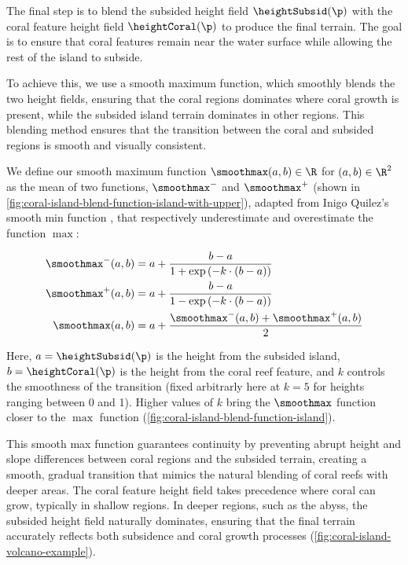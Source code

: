 The final step is to blend the subsided height field $\heightSubsid(\p)$ with the coral feature height field $\heightCoral(\p)$ to produce the final terrain. The goal is to ensure that coral features remain near the water surface while allowing the rest of the island to subside.

To achieve this, we use a smooth maximum function, which smoothly blends the two height fields, ensuring that the coral regions dominates where coral growth is present, while the subsided island terrain dominates in other regions. This blending method ensures that the transition between the coral and subsided regions is smooth and visually consistent.

We define our smooth maximum function $\smoothmax(a, b) \in \R$ for $(a, b) \in \R^2$ as the mean of two functions, $\smoothmax^-$ and $\smoothmax^+$ (shown in \cref{fig:coral-island-blend-function-island-with-upper}), adapted from Inigo Quilez's smooth min function \cite{Quilez2013}, that respectively underestimate and overestimate the function $\max$:

\begin{align}
    \smoothmax^-(a, b) &= a + \frac{b - a}{1 + \exp\left(-k \cdot (b - a) \right)} \\
    \smoothmax^+(a, b) &= a + \frac{b - a}{1 - \exp\left(-k \cdot (b - a) \right)} \\
    \smoothmax(a, b) &= a + \frac{\smoothmax^-(a, b) + \smoothmax^+(a, b)}{2}
\end{align}

Here, $a = \heightSubsid(\p)$ is the height from the subsided island, $b = \heightCoral(\p)$ is the height from the coral reef feature, and $k$ controls the smoothness of the transition (fixed arbitrarly here at $k=5$ for heights ranging between 0 and 1). Higher values of $k$ bring the $\smoothmax$ function closer to the $\max$ function (\cref{fig:coral-island-blend-function-island}).

This smooth max function guarantees continuity by preventing abrupt height and slope differences between coral regions and the subsided terrain, creating a smooth, gradual transition that mimics the natural blending of coral reefs with deeper areas. The coral feature height field takes precedence where coral can grow, typically in shallow regions. In deeper regions, such as the abyss, the subsided height field naturally dominates, ensuring that the final terrain accurately reflects both subsidence and coral growth processes (\cref{fig:coral-island-volcano-example}).

